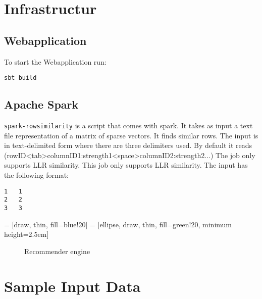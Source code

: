 \documentclass[twoside,a4paper]{article}
\begin{document}
\section{Infrastructur}
\label{sec:infrastructur}

\subsection{Webapplication}
\label{sec:web}

To start the Webapplication run:
\begin{verbatim}
sbt build 
\end{verbatim}


\appendix

\subsection{Apache Spark}
\label{sec:spark}
\verb|spark-rowsimilarity| is a script that comes with spark. It takes as input a text file representation of a matrix of sparse vectors. It finds similar rows. The input is in text-delimited form where there are three delimiters used. By default it reads (rowID<tab>columnID1:strength1<space>columnID2:strength2...) The job only supports LLR similarity. This job only supports LLR similarity.
The input has the following format:
\begin{verbatim}
1	1
2	2
3	3 
\end{verbatim}


 = [draw, thin, fill=blue!20]
 = [ellipse, draw, thin, fill=green!20, minimum height=2.5em]
\begin{figure}
\centering
{}
\caption{Recommender engine}
\end{figure}

\section{Sample Input Data}
\label{sec:sampleinput}
\end{document}
